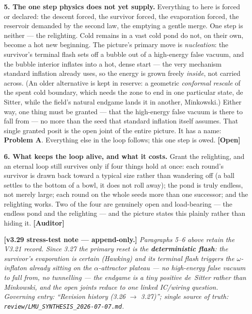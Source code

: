 \documentclass[11pt]{article}
\newcommand{\Open}{\textbf{\textcolor{gray!10!black}{[Open]}}}
\newcommand{\Auditor}{\textbf{\textcolor{teal!55!black}{[Auditor]}}}
\begin{document}
\noindent\textbf{5. The one step physics does not yet supply.} Everything to here is forced or declared: the descent forced, the survivor forced, the evaporation forced, the reservoir demanded by the second law, the emptying a gentle merge. One step is neither --- the relighting. Cold remains in a vast cold pond do not, on their own, become a hot new beginning. The picture's primary move is \emph{nucleation}: the survivor's terminal flash sets off a bubble out of a high-energy false vacuum, and the bubble interior inflates into a hot, dense start --- the very mechanism standard inflation already uses, so the energy is grown freely \emph{inside}, not carried across. (An older alternative is kept in reserve: a geometric \emph{conformal rescale} of the spent cold boundary, which needs the zone to end in one particular state, de Sitter, while the field's natural endgame lands it in another, Minkowski.) Either way, one thing must be granted --- that the high-energy false vacuum is there to fall from --- no more than the seed that standard inflation itself assumes. That single granted posit is the open joint of the entire picture. It has a name: \textbf{Problem A}. Everything else in the loop follows; this one step is owed. \Open

\noindent\textbf{6. What keeps the loop alive, and what it costs.} Grant the relighting, and an eternal loop still survives only if four things hold at once: each round's survivor is drawn back toward a typical size rather than wandering off (a ball settles to the bottom of a bowl, it does not roll away); the pond is truly endless, not merely large; each round on the whole seeds more than one successor; and the relighting works. Two of the four are genuinely open and load-bearing --- the endless pond and the relighting --- and the picture states this plainly rather than hiding it. \Auditor

\medskip
\noindent\textbf{[v3.29 stress-test note --- append-only.]} \emph{Paragraphs 5--6 above retain the V3.21 record. Since 3.27 the primary reset is the \textbf{deterministic flash}: the survivor's evaporation is certain (Hawking) and its terminal flash triggers the $\omega$-inflaton already sitting on the $\alpha$-attractor plateau --- no high-energy false vacuum to fall from, no tunnelling --- the endgame is a tiny \emph{positive} de~Sitter rather than Minkowski, and the open joints reduce to one linked IC/wiring question. Governing entry: ``Revision history (3.26 $\to$ 3.27)''; single source of truth: \texttt{review/LMU\_SYNTHESIS\_2026-07-07.md}.}
\end{document}
